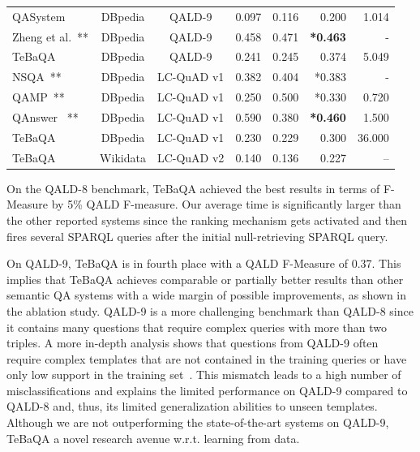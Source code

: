 \documentclass{IOS-Book-Article}
\begin{document}
\begin{table}[htb!]
{\begin{tabular}{lccrrrr}
        		QASystem~\cite{qald-9} & DBpedia & QALD-9& 0.097 & 0.116 & 0.200 & 1.014  \\ 
        		Zheng et al.~\cite{zheng2019question}**     & DBpedia& QALD-9 &0.458  & 0.471 & \textbf{*0.463} &- \\
        	    TeBaQA   & DBpedia& QALD-9 & 0.241 & 0.245 & 0.374 & 5.049  \\
            \midrule
        		NSQA~\cite{DBLP:journals/corr/abs-2012-01707}**       & DBpedia& LC-QuAD v1& 0.382  &  0.404 &   *0.383 & - \\
        		QAMP~\cite{DBLP:conf/cikm/VakulenkoGPRC19}**          & DBpedia& LC-QuAD v1 & 0.250 &  0.500  &  *0.330 & 0.720   \\  
        		QAnswer~\cite{DBLP:journals/semweb/DiefenbachGBSM20} **      & DBpedia& LC-QuAD v1 &  0.590  & 0.380  & \textbf{*0.460}   & 1.500
        		\\
                TeBaQA                                              & DBpedia& LC-QuAD v1&0.230 & 0.229 & 0.300 & 36.000 \\
             \midrule
             TeBaQA  & Wikidata& LC-QuAD v2 & 0.140 & 0.136 & 0.227  & -- \\
    		\bottomrule
        	\end{tabular}
        }
\end{table}

On the QALD-8 benchmark, TeBaQA achieved the best results in terms of F-Measure by 5\% QALD F-measure. Our average time is significantly larger than the other reported systems since the ranking mechanism gets activated and then fires several SPARQL queries after the initial null-retrieving SPARQL query. 

On QALD-9, TeBaQA is in fourth place with a QALD F-Measure of 0.37. This implies that TeBaQA achieves comparable or partially better results than other semantic QA systems with a wide margin of possible improvements, as shown in the ablation study.
QALD-9 is a more challenging benchmark than QALD-8 since it contains many questions that require complex queries with more than two triples. 
A more in-depth analysis shows that questions from QALD-9 often require complex templates that are not contained in the training queries or have only low support in the training set~\cite{DBLP:journals/corr/abs-2011-07743}. This mismatch leads to a high number of misclassifications and explains the limited performance on QALD-9 compared to QALD-8 and, thus, its limited generalization abilities to unseen templates.
Although we are not outperforming the state-of-the-art systems on QALD-9, TeBaQA a novel research avenue w.r.t. learning from data. 
\end{document}
